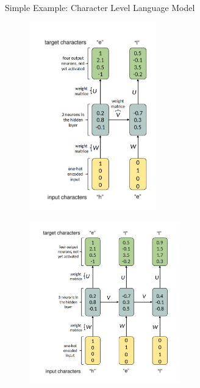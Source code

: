 \begin{vbframe}{Simple Example: Character Level Language Model}
   \begin{minipage}{0.55\textwidth}
     \begin{figure}
         \includegraphics[width=5.5cm]{plots/nlp1b.png}%
         \end{figure}
    \end{minipage}%
    
   \begin{minipage}{0.55\textwidth}         
    \begin{figure}     
         \includegraphics[width=6.5cm]{plots/nlp1c.png}%
       \end{figure}
    \end{minipage}%
 \end{vbframe}
